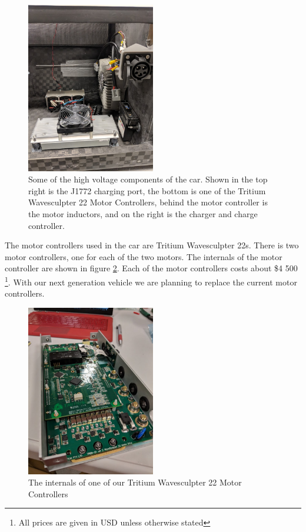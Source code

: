 \documentclass{article}
\begin{document}
    \begin{figure}[H]
        \centering
        \includegraphics[width=0.5\textwidth]{images/car_internals.jpg}
        \caption{Some of the high voltage components of the car. Shown
            in the top right is the J1772 charging port, the bottom is
            one of the Tritium Wavesculpter 22 Motor Controllers, behind
            the motor controller is the motor inductors, and on the
        right is the charger and charge controller.}
        \label{fig:charge}
    \end{figure}
    The motor controllers used in the car are Tritium Wavesculpter 22s.
    There is two motor controllers, one for each of the two motors. The
    internals of the motor controller are shown in figure
    \ref{fig:mc}. Each of the motor controllers costs about \$4 500
    \footnote{All prices are given in USD unless otherwise stated}.
    With our next generation vehicle we are planning to replace the
    current motor controllers.
    \begin{figure}[H]
        \centering
        \includegraphics[width=0.5\textwidth]{images/mc_inside.jpg}
        \caption{The internals of one of our Tritium Wavesculpter 22
            Motor Controllers}
        \label{fig:mc}
    \end{figure}
\end{document}

